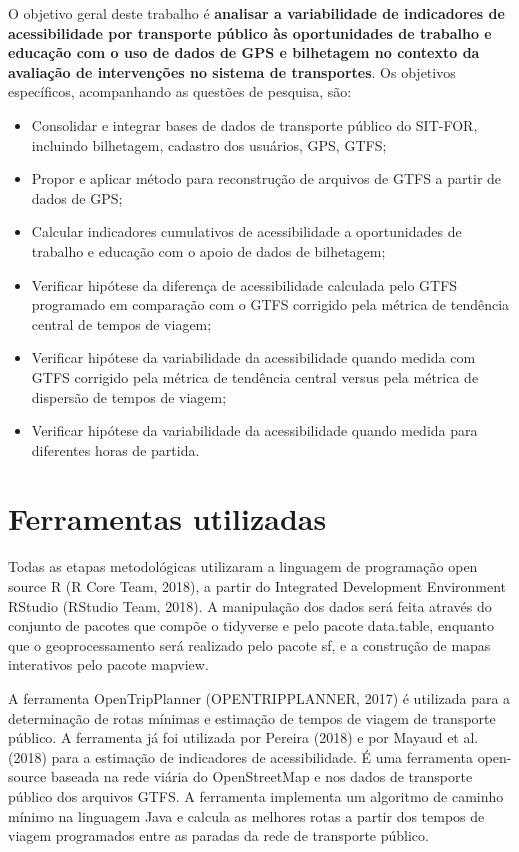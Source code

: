 \documentclass[        
    a4paper,          %
    12pt,             %
    chapter=TITLE,    %
    section=Title,    %
    subsection=Title, %
    oneside,          %
    english,          %
    spanish,          %
    brazil,           %
    fleqn             %
]{abntex2}
\begin{document}
  O objetivo geral deste trabalho é \textbf{analisar a variabilidade de indicadores de acessibilidade por transporte público às oportunidades de trabalho e educação com o uso de dados de GPS e bilhetagem no contexto da avaliação de intervenções no sistema de transportes}. Os objetivos específicos, acompanhando as questões de pesquisa, são:
  
  \begin{itemize}
  \tightlist
  \item
    Consolidar e integrar bases de dados de transporte público do SIT-FOR, incluindo bilhetagem, cadastro dos usuários, GPS, GTFS;
  \item
    Propor e aplicar método para reconstrução de arquivos de GTFS a partir de dados de GPS;
  \item
    Calcular indicadores cumulativos de acessibilidade a oportunidades de trabalho e educação com o apoio de dados de bilhetagem;
  \item
    Verificar hipótese da diferença de acessibilidade calculada pelo GTFS programado em comparação com o GTFS corrigido pela métrica de tendência central de tempos de viagem;
  \item
    Verificar hipótese da variabilidade da acessibilidade quando medida com GTFS corrigido pela métrica de tendência central versus pela métrica de dispersão de tempos de viagem;
  \item
    Verificar hipótese da variabilidade da acessibilidade quando medida para diferentes horas de partida.
  \end{itemize}
  
  \hypertarget{ferramentas-utilizadas}{%
  \section{Ferramentas utilizadas}\label{ferramentas-utilizadas}}
  
  Todas as etapas metodológicas utilizaram a linguagem de programação open source R (R Core Team, 2018), a partir do Integrated Development Environment RStudio (RStudio Team, 2018). A manipulação dos dados será feita através do conjunto de pacotes que compõe o tidyverse e pelo pacote data.table, enquanto que o geoprocessamento será realizado pelo pacote sf, e a construção de mapas interativos pelo pacote mapview.
  
  A ferramenta OpenTripPlanner (OPENTRIPPLANNER, 2017) é utilizada para a determinação de rotas mínimas e estimação de tempos de viagem de transporte público. A ferramenta já foi utilizada por Pereira (2018) e por Mayaud et al. (2018) para a estimação de indicadores de acessibilidade. É uma ferramenta open-source baseada na rede viária do OpenStreetMap e nos dados de transporte público dos arquivos GTFS. A ferramenta implementa um algoritmo de caminho mínimo na linguagem Java e calcula as melhores rotas a partir dos tempos de viagem programados entre as paradas da rede de transporte público.
  
\end{document}
